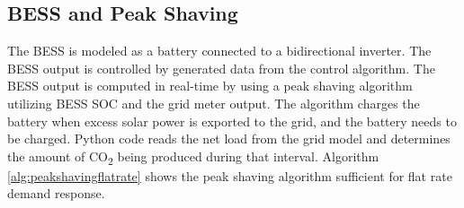 \documentclass[conference]{IEEEtran}
\begin{document}
    \subsection{BESS and Peak Shaving}
    	The BESS is modeled as a battery connected to a bidirectional inverter. The BESS output is controlled by generated data from the control algorithm. The BESS output is computed in real-time by using a peak shaving algorithm utilizing  BESS SOC and the grid meter output. The algorithm charges the battery when excess solar power is exported to the grid, and the battery needs to be charged. Python code reads the net load from the grid  model and determines the amount of CO\textsubscript{2} being produced during that interval.  Algorithm \ref{alg:peakshavingflatrate} shows the peak shaving algorithm sufficient for flat rate demand response. 
\end{document}

